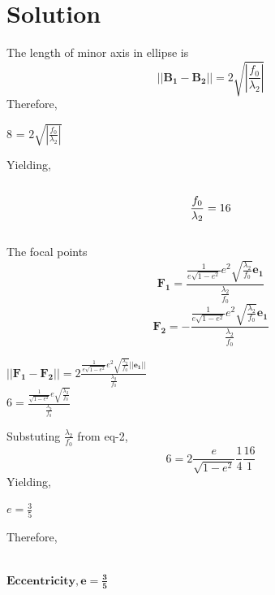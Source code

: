 \documentclass[journal,12pt,twocolumn]{IEEEtran}
\let\vec\mathbf
\begin{document}
\section{Solution}
The length of minor axis in ellipse is\\
\begin{equation}
        ||\vec{B_1} - \vec{B_2}|| = 2\sqrt{|\frac{f_0}{\lambda_2}|}\label{eq-1}
\end{equation}
Therefore,\\
\begin{center}
	8 = $2\sqrt{|\frac{f_0}{\lambda_2}|}$
\end{center}
Yielding,\\
\\
\begin{equation}
\frac{f_0}{\lambda_2} = 16 \label{eq-2}\\
\end{equation}
\\
The focal points \\
\begin{equation}
        \vec{F_1} =
        \frac{\frac{1}{e\sqrt{1 - e^2}}e^2\sqrt{\frac{\lambda_2}{f_0}}\vec{e_1}}{\frac{\lambda_2}{f_0}}
\end{equation}
\begin{equation}
        \vec{F_2} = -
        \frac{\frac{1}{e\sqrt{1 - e^2}}e^2\sqrt{\frac{\lambda_2}{f_0}}\vec{e_1}}{\frac{\lambda_2}{f_0}}
\end{equation}
\begin{center}
$||\vec{F_1} - \vec{F_2}|| = 2\frac{\frac{1}{e\sqrt{1 - e^2}}e^2\sqrt{\frac{\lambda_2}{f_0}}||\vec{e_1}||}{\frac{\lambda_2}{f_0}}$ \\
\vspace{0.3cm}
$6 = \frac{\frac{1}{\sqrt{1 - e^2}}e\sqrt{\frac{\lambda_2}{f_0}}}{\frac{\lambda_2}{f_0}}$
\end{center}
Substuting $\frac{\lambda_2}{f_0}$ from eq-2, \\
\begin{equation}
       6 = 2\frac{e}{\sqrt{1 - e^2}}\frac{1}{4}\frac{16}{1}
\end{equation}
 Yielding,   \\
 \begin{center}
	 $e = \frac{3}{5}$ 
 \end{center}
 Therefore,\\
\\
\begin{center}
$\boldsymbol{Eccentricity, e = \frac{3}{5}}$ 
\end{center}
\end{document}
